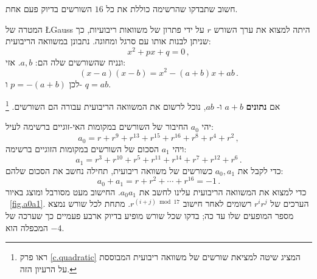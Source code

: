 \vspace{-4ex}

חשוב שתבדקו שהרשימה כוללת את כל 
$16$
השורשים בדיוק פעם אחת.

המטרה של
\L{Gauss}
היתה למצוא את ערך השורש
$r$
על ידי פתרון של משוואות ריבועיות, כך שניתן לבנות אותו עם סרגל ומחוגה. נתבונן במשוואה הריבועית:
\[
x^2+px+q=0\,,
\]
ונניח שהשורשים שלה הם:
$a,b$.
אזי:
\[
(x-a)(x-b)=x^2 - (a+b)x + ab\,.
\]
לכן
$p=-(a+b)$
ו-%
$q=ab$.

אם
\textbf{נתונים}
$a+b$
ו-%
$ab$,
נוכל לרשום את המשוואה הריבועית עבורה הם השורשים.%
\footnote{ראו פרק
\ref{c.quadratic}
המציג שיטה למציאת שורשים של משוואה ריבועית המבוססת על הרעיון הזה.}

יהי
$a_0$
החיבור של השורשים במקומות האי-זוגיים ברשימה לעיל:
\[
a_0=r + r^9 + r^{13} +r^{15} +r^{16} + r^8+r^4+r^2\,,
\]
ויהי
$a_1$
הסכום של השורשים במקומות הזוגיים ברשימה:
\[
a_1=r^3 + r^{10} + r^{5} +r^{11} +r^{14} + r^7+r^{12}+r^6\,.
\]
כדי לקבל את
$a_0,a_1$
כשורשים של משוואה ריבועית, תחילה נחשב את הסכום שלהם:
\[
a_0+a_1=r + r^2 + \cdots +r^{16}=-1\,.
\]
כדי למצוא את המשוואה הריבועית עלינו לחשב את
$a_0a_1$.
החישוב מעט מסורבל ומוצג באיור%
~\ref{fig.a0a1}.
הערכים של
$r^ir^j$
רשומים לאחר חישוב
$r^{(i+j) \bmod 17}$.
מתחת לכל שורש נמצא מספר המופעים שלו עד כה;
בדקו שכל שורש מופיע בדיוק ארבע פעמיים כך שערכה של המכפלה הוא 
$-4$.
